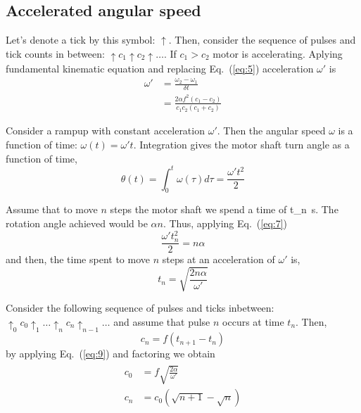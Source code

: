 \documentclass[a4paper]{article}
\newcommand{\vSI}[2]{\SI[math-rm=\ensuremath,parse-numbers=false]{#1}{#2}}
\begin{document}
\subsection{Accelerated angular speed}

Let's denote a tick by this symbol: $\uparrow$. Then, consider the
sequence of pulses and tick counts in between:
$\uparrow c_1\uparrow c_2\uparrow\dots$. If $c_1 > c_2$ motor is
accelerating. Aplying fundamental kinematic equation and replacing
Eq.~(\ref{eq:5}) acceleration $\omega'$ is
\begin{equation}
  \label{eq:6}
  \begin{split}
    \omega' & = \frac{\omega_2-\omega_1}{\delta t} \\
            & = \frac{2\alpha f^2(c_1-c_2)}{c_1 c_2 (c_1 + c_2)}
\end{split}
\end{equation}

Consider a rampup with constant acceleration $\omega'$. Then the
angular speed $\omega$ is a function of time: $\omega(t) = \omega'
t$. Integration gives the motor shaft turn angle as a function of
time,
\begin{equation}
  \label{eq:7}
  \theta(t) = \int_0^t \omega(\tau)d\tau = \frac{\omega't^2}{2}  
\end{equation}

Assume that to move $n$ steps the motor shaft we spend a time of
\vSI{t_n}{\second}. The rotation angle achieved would be $\alpha
n$. Thus, applying Eq.~(\ref{eq:7})
\begin{equation}
  \label{eq:8}
  \frac{\omega't_n^2}{2} = n\alpha
\end{equation}
%
%
and then, the time spent to move $n$ steps at an acceleration of
$\omega'$ is,
\begin{equation}
  \label{eq:9}
  t_n = \sqrt{\frac{2n\alpha}{\omega'}}  
\end{equation}

%
%
Consider the following sequence of pulses and ticks inbetween:
$\uparrow_0 c_0 \uparrow_1 \dots \uparrow_n c_n \uparrow_{n-1}\dots$
and assume that pulse $n$ occurs at time $t_n$. Then,
\begin{equation}
  \label{eq:10}
  c_n = f (t_{n+1} - t_n)  
\end{equation}
by applying Eq.~(\ref{eq:9}) and factoring we obtain
\begin{eqnarray}
  \label{eq:12}
  \begin{split}
    c_0 & = f \sqrt{\frac{2\alpha}{\omega'}} \\
    c_n & = c_0 (\sqrt{n+1} - \sqrt{n})
  \end{split}
\end{eqnarray}
\end{document}
